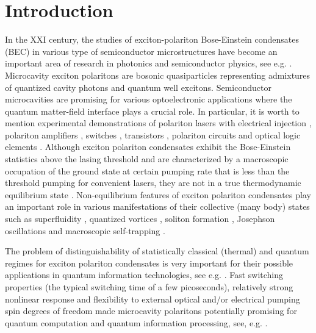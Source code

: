 \documentclass[aps, pre, preprint, groupedaddress, superscriptaddress, showkeys, showpacs] {revtex4-1}
\begin{document}
\newcommand{\sn}{\textrm{sn}}
\newcommand{\cn}{\textrm{cn}}
\newcommand{\dn}{\textrm{dn}}
\newcommand{\sd}{\textrm{sd}}
\newcommand{\cd}{\textrm{cd}}
\newcommand{\nd}{\textrm{nd}}
\newcommand{\am}{\textrm{am}}

\section{Introduction \label{sec:introduction}}

In the XXI century, the studies of exciton-polariton Bose-Einstein condensates (BEC) in various type of semiconductor microstructures have become an important area of research in photonics and semiconductor physics, see e.g. \cite{Sanvitto, Guillet}.
Microcavity exciton polaritons are bosonic quasiparticles representing admixtures of quantized cavity photons and quantum well excitons.
Semiconductor microcavities are promising for various optoelectronic applications where the quantum  matter-field interface plays a crucial role.
In particular, it is worth to mention experimental demonstrations of polariton lasers with electrical injection \cite{Bhattacharya,Schneider}, polariton amplifiers \cite{Niemietz}, switches \cite{Amo_2010}, transistors \cite{Ballarini}, polariton circuits and optical logic elements \cite{Sturm,Liew}.
Although exciton polariton condensates exhibit the Bose-Einstein statistics above the lasing threshold and are characterized by a macroscopic occupation of the ground state at certain pumping rate that is less than the threshold pumping for convenient lasers, they are not in a true thermodynamic equilibrium state \cite{Byrnes_2014,Sun}. Non-equilibrium features of exciton polariton condensates play an important role in various manifestations of their collective (many body) states such as superfluidity \cite{Carusotto_2013,Amo_2009}, quantized vortices \cite{Lagoudakis_2008,Lagoudakis_2009}, soliton formation \cite{Sich}, Josephson oscillations and macroscopic self-trapping \cite{Abbarchi,Lagoudakis_2010}.
    
The problem of distinguishability of statistically classical (thermal) and quantum regimes for exciton polariton condensates is very important for their possible applications in quantum information technologies, see e.g. \cite{Dominici}.
Fast switching properties (the typical switching time of a few picoseconds), relatively strong nonlinear response and flexibility to external optical and/or electrical pumping spin degrees of freedom made microcavity polaritons potentially promising for quantum computation and quantum information processing, see, e.g. \cite{Demirchyan,Pagel,Kyriienko,Solnyshkov_2015, Dominici}.
\end{document}
